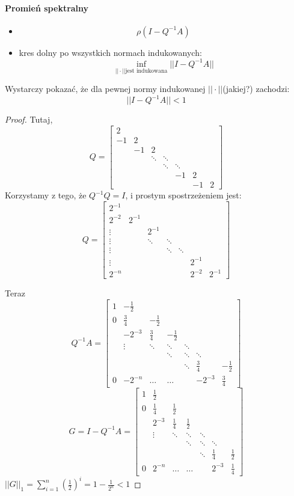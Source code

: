 \documentclass{article}
\begin{document}
\paragraph{Promień spektralny} 
\begin{itemize}
	\item$$ \rho(I-Q^{-1}A) $$
	\item kres dolny po wszystkich normach indukowanych:
	$$\inf_{||\cdot||\text{jest indukowana}}||I-Q^{-1}A ||$$
\end{itemize}

Wystarczy pokazać, że dla pewnej normy indukowanej $ ||\cdot|| $(jakiej?) zachodzi: $$ ||I-Q^{-1}A ||<1$$
\begin{proof}
Tutaj, $$
Q=\begin{bmatrix}
2&&&&&\\
-1&2&&&&&\\
&-1&2&&&&\\
&&\ddots&\ddots&&&\\
&&&\ddots&\ddots&&\\
&&&&-1&2&\\
&&&&&-1&2
\end{bmatrix}
$$
Korzystamy z tego, że $ Q^{-1}Q=I $, i prostym spostrzeżeniem jest:
$$
Q=\begin{bmatrix}
2^{-1}&&&&&\\
2^{-2}&2^{-1}&&&&&\\
\vdots&&2^{-1}&&&&\\
\vdots&&\ddots&\ddots&&&\\
\vdots&&&\ddots&\ddots&&\\
\vdots&&&&&2^{-1}&\\
2^{-n}&&&&&2^{-2}&2^{-1}
\end{bmatrix}
$$

Teraz 
$$
Q^{-1}A=\begin{bmatrix}
1&-\frac12&&&&\\
0&\frac34&-\frac12&&&&\\
&-2^{-3}&\frac34&-\frac12&&&\\
&\vdots&\ddots&\ddots&\ddots&&\\
&&&\ddots&\ddots&\ddots&\\
&&&&\ddots&\frac34&-\frac12\\
0&-2^{-n}&\ldots&\ldots&&-2^{-3}&\frac34
\end{bmatrix}
$$
$$
G=I-Q^{-1}A=\begin{bmatrix}
1&\frac12&&&&\\
0&\frac14&\frac12&&&&\\
&2^{-3}&\frac14&\frac12&&&\\
&\vdots&\ddots&\ddots&\ddots&&\\
&&&\ddots&\ddots&\ddots&\\
&&&&\ddots&\frac14&\frac12\\
0&2^{-n}&\ldots&\ldots&&2^{-3}&\frac14
\end{bmatrix}
$$
$ ||G||_1=\sum_{i=1}^n(\frac12)^i=1-\frac1{2^n}<1 $
\end{proof}
\end{document}

